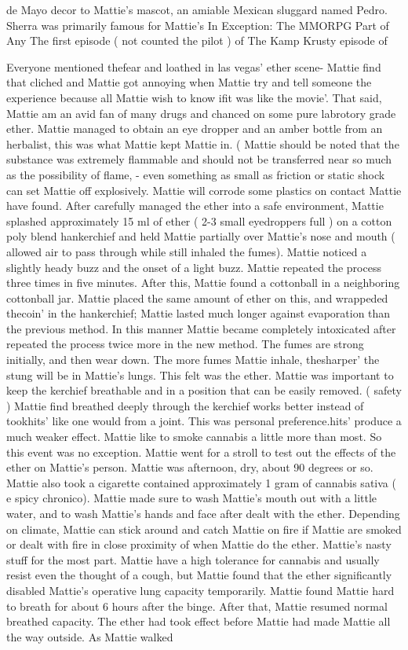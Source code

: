 \documentclass[12pt]{book}
\begin{document}
de Mayo decor to Mattie's mascot, an amiable Mexican sluggard named Pedro. Sherra was primarily famous for Mattie's In Exception: The MMORPG Part of Any The first episode ( not counted the pilot ) of The Kamp Krusty episode of



Everyone mentioned thefear and loathed in las vegas' ether scene- Mattie find that cliched and Mattie got annoying when Mattie try and tell someone the experience because all Mattie wish to know ifit was like the movie'. That said, Mattie am an avid fan of many drugs and chanced on some pure labrotory grade ether. Mattie managed to obtain an eye dropper and an amber bottle from an herbalist, this was what Mattie kept Mattie in. ( Mattie should be noted that the substance was extremely flammable and should not be transferred near so much as the possibility of flame, - even something as small as friction or static shock can set Mattie off explosively. Mattie will corrode some plastics on contact Mattie have found. After carefully managed the ether into a safe environment, Mattie splashed approximately 15 ml of ether ( 2-3 small eyedroppers full ) on a cotton poly blend hankerchief and held Mattie partially over Mattie's nose and mouth ( allowed air to pass through while still inhaled the fumes). Mattie noticed a slightly heady buzz and the onset of a light buzz. Mattie repeated the process three times in five minutes. After this, Mattie found a cottonball in a neighboring cottonball jar. Mattie placed the same amount of ether on this, and wrappeded thecoin' in the hankerchief; Mattie lasted much longer against evaporation than the previous method. In this manner Mattie became completely intoxicated after repeated the process twice more in the new method. The fumes are strong initially, and then wear down. The more fumes Mattie inhale, thesharper' the stung will be in Mattie's lungs. This felt was the ether. Mattie was important to keep the kerchief breathable and in a position that can be easily removed. ( safety ) Mattie find breathed deeply through the kerchief works better instead of tookhits' like one would from a joint. This was personal preference.hits' produce a much weaker effect. Mattie like to smoke cannabis a little more than most. So this event was no exception. Mattie went for a stroll to test out the effects of the ether on Mattie's person. Mattie was afternoon, dry, about 90 degrees or so. Mattie also took a cigarette contained approximately 1 gram of cannabis sativa ( e spicy chronico). Mattie made sure to wash Mattie's mouth out with a little water, and to wash Mattie's hands and face after dealt with the ether. Depending on climate, Mattie can stick around and catch Mattie on fire if Mattie are smoked or dealt with fire in close proximity of when Mattie do the ether. Mattie's nasty stuff for the most part. Mattie have a high tolerance for cannabis and usually resist even the thought of a cough, but Mattie found that the ether significantly disabled Mattie's operative lung capacity temporarily. Mattie found Mattie hard to breath for about 6 hours after the binge. After that, Mattie resumed normal breathed capacity. The ether had took effect before Mattie had made Mattie all the way outside. As Mattie walked 
\end{document}
